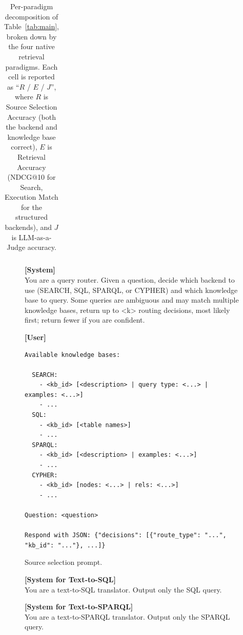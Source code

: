 \documentclass{llmxive}
\begin{document}
{\begin{table}[t]
{\begin{tabular}{l l c c c c}
        \bottomrule
    \end{tabular}
    }
\caption{
    Per-paradigm decomposition of Table~\ref{tab:main}, broken down by the four native retrieval paradigms. Each cell is reported as ``$R$ / $E$ / $J$'', where $R$ is Source Selection Accuracy (both the backend and knowledge base correct), $E$ is Retrieval Accuracy (NDCG@10 for Search, Execution Match for the structured backends), and $J$ is LLM-as-a-Judge accuracy.
    }
\label{tab:per_route_breakdown}
\end{table}




\begin{figure}
\centering
\begin{promptbox}
\textbf{[System]}\\[2pt]
You are a query router. Given a question, decide which backend to use (SEARCH, SQL, SPARQL, or CYPHER) and which knowledge base to query. Some queries are ambiguous and may match multiple knowledge bases, return up to <k> routing decisions, most likely first; return fewer if you are confident.

\tcbline

\textbf{[User]}\\[2pt]
\begin{verbatim}
Available knowledge bases:

  SEARCH:
    - <kb_id> [<description> | query type: <...> | examples: <...>]
    - ...
  SQL:
    - <kb_id> [<table names>]
    - ...
  SPARQL:
    - <kb_id> [<description> | examples: <...>]
    - ...
  CYPHER:
    - <kb_id> [nodes: <...> | rels: <...>]
    - ...

Question: <question>

Respond with JSON: {"decisions": [{"route_type": "...", "kb_id": "..."}, ...]}
\end{verbatim}
\end{promptbox}
\caption{Source selection prompt.}
\label{fig:source_selection_prompt}
\end{figure}


\begin{figure}
\centering
\begin{promptbox}
\textbf{[System for Text-to-SQL]}\\[2pt]
You are a text-to-SQL translator. Output only the SQL query.

\textbf{[System for Text-to-SPARQL]}\\[2pt]
You are a text-to-SPARQL translator. Output only the SPARQL query.


\end{promptbox}
\end{figure}}
\end{document}
